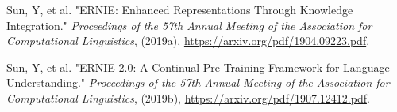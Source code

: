 \begin{enumerateSpaced}{4pt}
    
    \item Sun, Y, et al. "ERNIE: Enhanced Representations Through Knowledge Integration." \emph{Proceedings of the 57th Annual Meeting of the Association for Computational Linguistics}, (2019a), \url{https://arxiv.org/pdf/1904.09223.pdf}.
    
    \item Sun, Y, et al. "ERNIE 2.0: A Continual Pre-Training Framework for Language Understanding." \emph{Proceedings of the 57th Annual Meeting of the Association for Computational Linguistics}, (2019b), \url{https://arxiv.org/pdf/1907.12412.pdf}.
    
\end{enumerateSpaced}
    